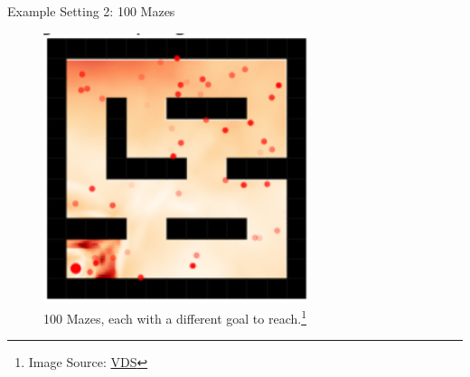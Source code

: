 \documentclass[aspectratio=169]{../latex_main/tntbeamer}  %
\begin{document}
\begin{frame}[c]{Example Setting 2: 100 Mazes}

\begin{figure}
\centering
\includegraphics[scale=1]{images/maze}
\caption{100 Mazes, each with a different goal to reach.\footnote{Image Source: \href{https://arxiv.org/pdf/2006.09641.pdf}{VDS}}}
\end{figure}

\end{frame}
\end{document}
